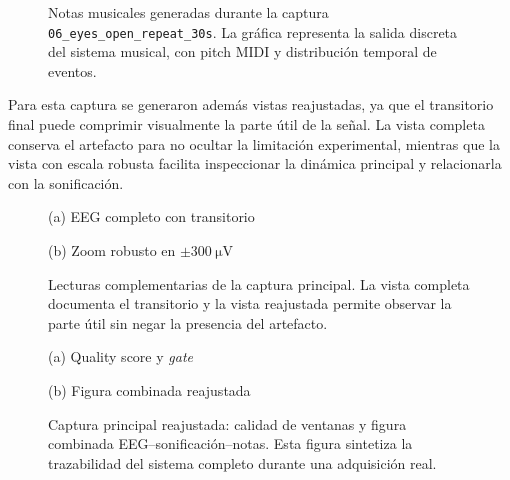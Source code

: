 \begin{figure}[htbp]
    \centering
    \caption{Notas musicales generadas durante la captura \texttt{06\_eyes\_open\_repeat\_30s}. La gráfica representa la salida discreta del sistema musical, con pitch MIDI y distribución temporal de eventos.}
    \label{fig:validacion_s01_06_notes}
\end{figure}

Para esta captura se generaron además vistas reajustadas, ya que el transitorio final puede comprimir visualmente la parte útil de la señal. La vista completa conserva el artefacto para no ocultar la limitación experimental, mientras que la vista con escala robusta facilita inspeccionar la dinámica principal y relacionarla con la sonificación.

\begin{figure}[htbp]
    \centering
    \begin{minipage}{0.49\textwidth}
        \centering
        \small (a) EEG completo con transitorio
    \end{minipage}
    \hfill
    \begin{minipage}{0.49\textwidth}
        \centering
        \small (b) Zoom robusto en \(\pm\SI{300}{\micro\volt}\)
    \end{minipage}
    \caption{Lecturas complementarias de la captura principal. La vista completa documenta el transitorio y la vista reajustada permite observar la parte útil sin negar la presencia del artefacto.}
    \label{fig:validacion_s01_06_eeg_completo_zoom}
\end{figure}

\begin{figure}[htbp]
    \centering
    \begin{minipage}{0.49\textwidth}
        \centering
        \small (a) Quality score y \textit{gate}
    \end{minipage}
    \hfill
    \begin{minipage}{0.49\textwidth}
        \centering
        \small (b) Figura combinada reajustada
    \end{minipage}
    \caption{Captura principal reajustada: calidad de ventanas y figura combinada EEG--sonificación--notas. Esta figura sintetiza la trazabilidad del sistema completo durante una adquisición real.}
    \label{fig:validacion_s01_06_reajustada}
\end{figure}

